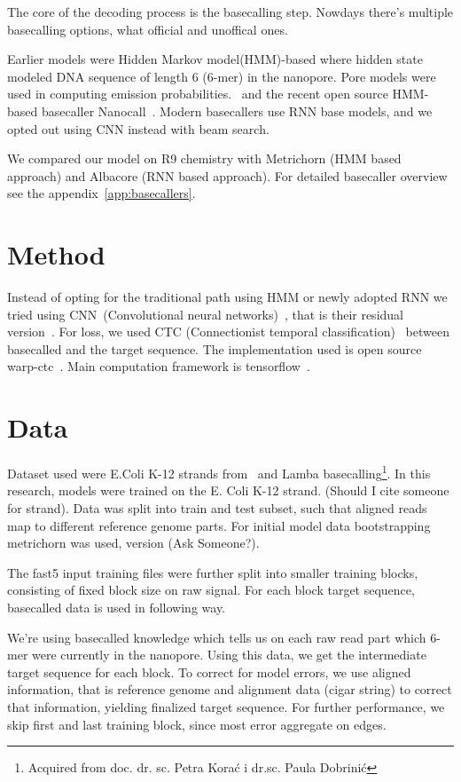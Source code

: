 \documentclass[runningheads,a4paper]{llncs}
\begin{document}
The core of the decoding process is the basecalling step. Nowdays there's multiple basecalling options, what official and unoffical ones.

Earlier models were Hidden Markov model(HMM)-based where hidden state modeled DNA sequence of length 6 (6-mer) in the nanopore. Pore models were used in computing emission probabilities.~\cite{loman2015complete,schreiber2015analysis,szalay2015novo,timp2012dna} and the recent open source HMM-based basecaller Nanocall~\cite{david2016nanocall}. Modern basecallers use RNN base models, and we opted out using CNN instead with beam search.

We compared our model on R9 chemistry with Metrichorn (HMM based approach) and Albacore (RNN based approach). For detailed basecaller overview see the appendix~\ref{app:basecallers}.

\section{Method}
Instead of opting for the traditional path using HMM or newly adopted RNN we tried using CNN~(Convolutional neural networks)~\cite{lecun-98}, that is their residual version~\cite{he2016deep}. For loss, we used CTC (Connectionist temporal classification)~\cite{graves2006connectionist} between basecalled and the target sequence. The implementation used is open source warp-ctc~\cite{warpctc}. Main computation framework is tensorflow~\cite{tensorflow2015-whitepaper}.

\section{Data}

Dataset used were E.Coli K-12 strands from~\cite{loman1-100k} and Lamba basecalling\footnote{Acquired from doc. dr. sc. Petra Korać i dr.sc. Paula Dobrinić}. In this research, models were trained on the E. Coli K-12 strand. (Should I cite someone for strand). Data was split into train and test subset, such that aligned reads map to different reference genome parts. For initial model data bootstrapping metrichorn was used, version (Ask Someone?).

The fast5 input training files were further split into smaller training blocks, consisting of fixed block size on raw signal. For each block target sequence, basecalled data is used in following way.

We're using basecalled knowledge which tells us on each raw read part which 6-mer were currently in the nanopore. Using this data, we get the intermediate target sequence for each block. To correct for model errors, we use aligned information, that is reference genome and alignment data (cigar string) to correct that information, yielding finalized target sequence. For further performance, we skip first and last training block, since most error aggregate on edges.
\end{document}
